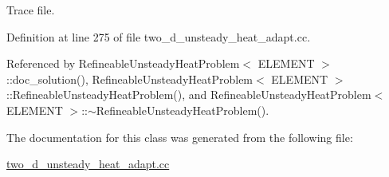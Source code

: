 Trace file. 



Definition at line 275 of file two\+\_\+d\+\_\+unsteady\+\_\+heat\+\_\+adapt.\+cc.



Referenced by Refineable\+Unsteady\+Heat\+Problem$<$ E\+L\+E\+M\+E\+N\+T $>$\+::doc\+\_\+solution(), Refineable\+Unsteady\+Heat\+Problem$<$ E\+L\+E\+M\+E\+N\+T $>$\+::\+Refineable\+Unsteady\+Heat\+Problem(), and Refineable\+Unsteady\+Heat\+Problem$<$ E\+L\+E\+M\+E\+N\+T $>$\+::$\sim$\+Refineable\+Unsteady\+Heat\+Problem().



The documentation for this class was generated from the following file\+:\begin{DoxyCompactItemize}
\item 
\hyperlink{two__d__unsteady__heat__adapt_8cc}{two\+\_\+d\+\_\+unsteady\+\_\+heat\+\_\+adapt.\+cc}\end{DoxyCompactItemize}
